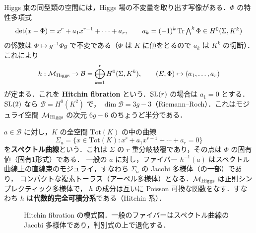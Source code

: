 Higgs 束の同型類の空間には，Higgs 場の不変量を取り出す写像がある．$\Phi$ の特性多項式
\begin{equation}
  \det(x - \Phi) = x^r + a_1 x^{r-1} + \cdots + a_r,\qquad a_k = (-1)^k\operatorname{Tr}\textstyle\bigwedge^k\Phi\in H^0(\Sigma,K^k)
\end{equation}
の係数は $\Phi\mapsto g^{-1}\Phi g$ で不変である（$\Phi$ は $K$ に値をとるので $a_k$ は $K^k$ の切断）．
これにより
\begin{equation}
  h:\mathcal{M}_{\rm Higgs}\to\mathcal{B}=\bigoplus_{k=1}^{r}H^0(\Sigma,K^k),\qquad (E,\Phi)\mapsto(a_1,\dots,a_r)
\end{equation}
が定まる．これを \textbf{Hitchin fibration} という．$\operatorname{SL}(r)$ の場合は $a_1=0$ とする．$\operatorname{SL}(2)$ なら $\mathcal{B}=H^0(K^2)$ で，
$\dim\mathcal{B} = 3g-3$（Riemann--Roch）．これはモジュライ空間 $\mathcal{M}_{\rm Higgs}$ の次元 $6g-6$ のちょうど半分である．

$a\in\mathcal{B}$ に対し，$K$ の全空間 $\mathrm{Tot}(K)$ の中の曲線
\begin{equation}
  \Sigma_a = \{x\in\mathrm{Tot}(K):x^r + a_1x^{r-1}+\cdots+a_r=0\}
\end{equation}
を\textbf{スペクトル曲線}という．これは $\Sigma$ の $r$ 重分岐被覆であり，その点は $\Phi$ の固有値（固有1形式）である．
一般の $a$ に対し，ファイバー $h^{-1}(a)$ はスペクトル曲線上の直線束のモジュライ，すなわち $\Sigma_a$ の Jacobi 多様体（の一部）であり，
コンパクトな複素トーラス（アーベル多様体）となる．$\mathcal{M}_{\rm Higgs}$ は正則シンプレクティック多様体で，
$h$ の成分は互いに Poisson 可換な関数をなす．すなわち $h$ は\textbf{代数的完全可積分系}である（Hitchin 系）．

\begin{figure}[ht]
\centering
{}
\caption{Hitchin fibration の模式図．一般のファイバーはスペクトル曲線の Jacobi 多様体であり，判別式の上で退化する．}
\label{fig:ch14-hitchin}
\end{figure}

